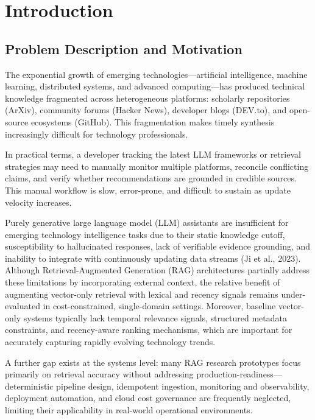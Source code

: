 \chapter{Introduction}

\section{Problem Description and Motivation}
\label{sec:problem}

The exponential growth of emerging technologies---artificial intelligence, machine learning, distributed systems, and advanced computing---has produced technical knowledge fragmented across heterogeneous platforms: scholarly repositories (ArXiv), community forums (Hacker News), developer blogs (DEV.to), and open-source ecosystems (GitHub). This fragmentation makes timely synthesis increasingly difficult for technology professionals.

In practical terms, a developer tracking the latest LLM frameworks or retrieval strategies may need to manually monitor multiple platforms, reconcile conflicting claims, and verify whether recommendations are grounded in credible sources. This manual workflow is slow, error-prone, and difficult to sustain as update velocity increases.

Purely generative large language model (LLM) assistants are insufficient for emerging technology intelligence tasks due to their static knowledge cutoff, susceptibility to hallucinated responses, lack of verifiable evidence grounding, and inability to integrate with continuously updating data streams (Ji et al., 2023). Although Retrieval-Augmented Generation (RAG) architectures partially address these limitations by incorporating external context, the relative benefit of augmenting vector-only retrieval with lexical and recency signals remains under-evaluated in cost-constrained, single-domain settings. Moreover, baseline vector-only systems typically lack temporal relevance signals, structured metadata constraints, and recency-aware ranking mechanisms, which are important for accurately capturing rapidly evolving technology trends.

A further gap exists at the systems level: many RAG research prototypes focus primarily on retrieval accuracy without addressing production-readiness---deterministic pipeline design, idempotent ingestion, monitoring and observability, deployment automation, and cloud cost governance are frequently neglected, limiting their applicability in real-world operational environments.

